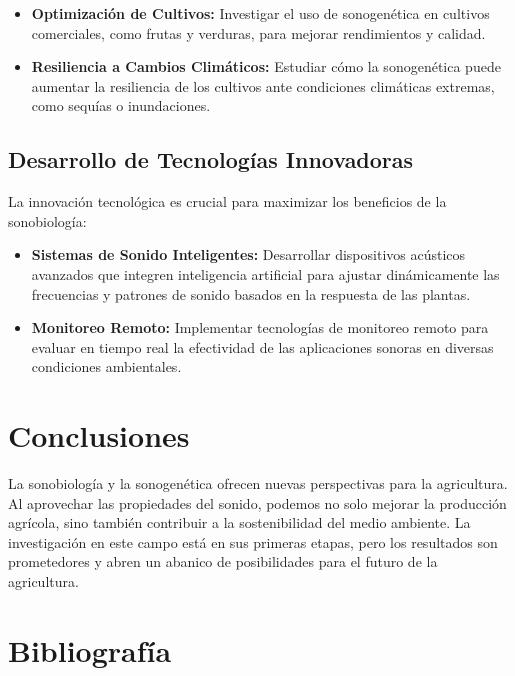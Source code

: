 \documentclass[twocolumn]{article}
\begin{document}
\begin{itemize}
    \item \textbf{Optimización de Cultivos:} Investigar el uso de sonogenética en cultivos comerciales, como frutas y verduras, para mejorar rendimientos y calidad.
    
    \item \textbf{Resiliencia a Cambios Climáticos:} Estudiar cómo la sonogenética puede aumentar la resiliencia de los cultivos ante condiciones climáticas extremas, como sequías o inundaciones.
\end{itemize}

\subsection{Desarrollo de Tecnologías Innovadoras}

La innovación tecnológica es crucial para maximizar los beneficios de la sonobiología:

\begin{itemize}
    \item \textbf{Sistemas de Sonido Inteligentes:} Desarrollar dispositivos acústicos avanzados que integren inteligencia artificial para ajustar dinámicamente las frecuencias y patrones de sonido basados en la respuesta de las plantas.
    
    \item \textbf{Monitoreo Remoto:} Implementar tecnologías de monitoreo remoto para evaluar en tiempo real la efectividad de las aplicaciones sonoras en diversas condiciones ambientales.
\end{itemize}




\section{Conclusiones}
La sonobiología y la sonogenética ofrecen nuevas perspectivas para la agricultura. Al aprovechar las propiedades del sonido, podemos no solo mejorar la producción agrícola, sino también contribuir a la sostenibilidad del medio ambiente. La investigación en este campo está en sus primeras etapas, pero los resultados son prometedores y abren un abanico de posibilidades para el futuro de la agricultura.

\section*{Bibliografía}
\end{document}
